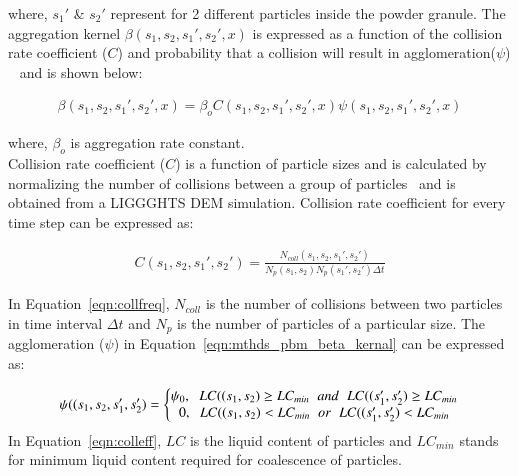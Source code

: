 \documentclass[preprint,11pt,authoryear]{elsarticle}
\begin{document}
where, $s_1'$ \& $s_2'$ represent for 2 different particles inside the powder granule. 
The aggregation kernel $\beta(s_1,s_2, s_1',s_2',x)$ is expressed as a function of the collision 
rate coefficient ($C$) and probability that a collision will result in agglomeration($\psi$)
~\citep{ingram2004} and is shown below: 

\begin{align}
\beta(s_1,s_2,s_1',s_2',x) = \beta_oC(s_1,s_2,s_1',s_2',x)\psi(s_1,s_2,s_1',s_2',x)
\label{eqn:mthds_pbm_beta_kernal}
\end{align}

where, $\beta_o$ is aggregation rate constant.\\
Collision rate coefficient ($C$) is a function of particle sizes and is calculated by normalizing the 
number of collisions between a group of particles~\citep{gantt2006} and is obtained from a LIGGGHTS 
DEM simulation. Collision rate coefficient for every time step can be expressed as:

\begin{align}
C(s_1,s_2,s_1',s_2')=\frac{N_{coll}(s_1,s_2,s_1',s_2')}{N_p(s_1,s_2)N_p(s_1',s_2')\Delta t}
\label{eqn:collfreq}
\end{align}

In Equation~\ref{eqn:collfreq}, $N_{coll}$ is the number of collisions between two particles in 
time interval $\Delta t$ and $N_p$ is the number of particles of a particular size. The agglomeration 
($\psi$) in Equation~\ref{eqn:mthds_pbm_beta_kernal} can be expressed as:

\begin{align}
\psi((s_1,s_2,s_1',s_2') = 
\left\{\begin{matrix}
\psi_0,\hspace{0.2cm} LC((s_1,s_2) \geq LC_{min}\hspace{0.2cm} and\hspace{0.2cm} LC((s_1',s_2') \geq LC_{min}	\\ 
0,\hspace{0.2cm} LC((s_1,s_2) < LC_{min}\hspace{0.2cm} or\hspace{0.2cm} LC((s_1',s_2') < LC_{min}
\end{matrix}\right.
\label{eqn:colleff}
\end{align}
 In Equation~\ref{eqn:colleff}, $LC$ is the liquid content of particles and $LC_{min}$ stands for minimum 
 liquid content required for coalescence of particles. 
\end{document}
